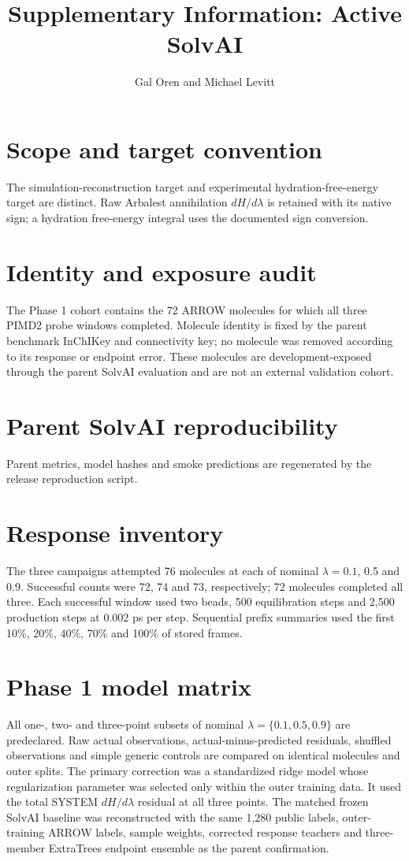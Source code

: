 \documentclass[11pt]{article}
\title{Supplementary Information: Active SolvAI}
\author{Gal Oren and Michael Levitt}
\date{}
\begin{document}
\maketitle
\section{Scope and target convention}
The simulation-reconstruction target and experimental hydration-free-energy target are distinct. Raw Arbalest annihilation $dH/d\lambda$ is retained with its native sign; a hydration free-energy integral uses the documented sign conversion.
\section{Identity and exposure audit}
The Phase 1 cohort contains the 72 ARROW molecules for which all three PIMD2 probe windows completed. Molecule identity is fixed by the parent benchmark InChIKey and connectivity key; no molecule was removed according to its response or endpoint error. These molecules are development-exposed through the parent SolvAI evaluation and are not an external validation cohort.
\section{Parent SolvAI reproducibility}
Parent metrics, model hashes and smoke predictions are regenerated by the
release reproduction script.
\section{Response inventory}
The three campaigns attempted 76 molecules at each of nominal $\lambda=0.1$, 0.5 and 0.9. Successful counts were 72, 74 and 73, respectively; 72 molecules completed all three. Each successful window used two beads, 500 equilibration steps and 2,500 production steps at 0.002 ps per step. Sequential prefix summaries used the first 10\%, 20\%, 40\%, 70\% and 100\% of stored frames.
\section{Phase 1 model matrix}
All one-, two- and three-point subsets of nominal $\lambda=\{0.1,0.5,0.9\}$ are predeclared. Raw actual observations, actual-minus-predicted residuals, shuffled observations and simple generic controls are compared on identical molecules and outer splits.
The primary correction was a standardized ridge model whose regularization parameter was selected only within the outer training data. It used the total SYSTEM $dH/d\lambda$ residual at all three points. The matched frozen SolvAI baseline was reconstructed with the same 1,280 public labels, outer-training ARROW labels, sample weights, corrected response teachers and three-member ExtraTrees endpoint ensemble as the parent confirmation.
\end{document}
